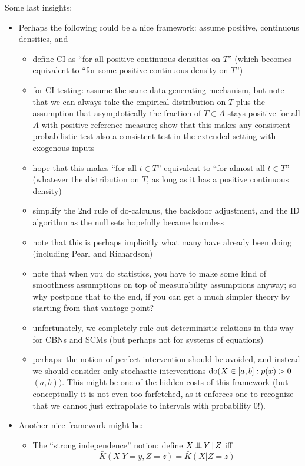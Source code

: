 Some last insights:
\begin{itemize}
  \item Perhaps the following could be a nice framework: assume positive, continuous densities, and
    \begin{itemize}
      \item define CI as ``for all positive continuous densities on $T$'' (which becomes equivalent to ``for some positive continuous density on $T$'')
      \item for CI testing: assume the same data generating mechanism, but note that we can always take the empirical distribution on $T$ plus the assumption that asymptotically the fraction of $T \in A$ stays positive for all $A$ with positive reference measure; show that this makes any consistent probabilistic test also a consistent test in the extended setting with exogenous inputs
      \item hope that this makes ``for all $t \in T$'' equivalent to ``for almost all $t \in T$'' (whatever the distribution on $T$, as long as it has a positive continuous density)
      \item simplify the 2nd rule of do-calculus, the backdoor adjustment, and the ID algorithm as the null sets hopefully became harmless
      \item note that this is perhaps implicitly what many have already been doing (including Pearl and Richardson)
      \item note that when you do statistics, you have to make some kind of smoothness assumptions on top of measurability assumptions anyway; so why postpone that to the end, if you can get a much simpler theory by starting from that vantage point?
      \item unfortunately, we completely rule out deterministic relations in this way for CBNs and SCMs (but perhaps not for systems of equations)
      \item perhaps: the notion of perfect intervention should be avoided, and instead we should consider only stochastic interventions $\operatorname{do}(X \in [a,b] : p(x) > 0 $$ (a,b))$. This might be one of the hidden costs of this framework (but conceptually it is not even too farfetched, as it enforces one to recognize that we cannot just extrapolate to intervals with probability 0!).
    \end{itemize}
  \item Another nice framework might be:
    \begin{itemize}
      \item The ``strong independence'' notion: define $X \operatorname*{\perp\mkern-11mu\perp} Y \operatorname*{|} Z$ iff $$\bar{K}(X | Y=y,Z=z) = \bar{K}(X | Z=z)$$

\end{itemize}
\end{itemize}
